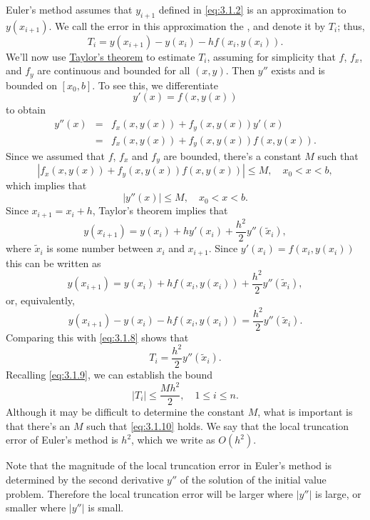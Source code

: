 \documentclass{ximera}
\begin{document}
Euler's method assumes that $y_{i+1}$ defined in \eqref{eq:3.1.2}  is
an approximation to $y(x_{i+1})$. We call the error in this
approximation the ,
and denote it by $T_i$;   thus,
\begin{equation} \label{eq:3.1.8}
T_i=y(x_{i+1})-y(x_i)-hf(x_i,y(x_i)).
\end{equation}
We'll now use
\href{http://www-history.mcs.st-and.ac.uk/Mathematicians/Taylor.html}{Taylor's theorem}
 to estimate $T_i$, assuming for
simplicity that $f$, $f_x$, and $f_y$ are continuous and bounded for
all $(x,y)$. Then $y''$ exists and is bounded on $[x_0,b]$. To see
this, we differentiate
$$
y'(x)=f(x,y(x))
$$
to obtain
\begin{eqnarray*}
y''(x) & = & f_x(x,y(x))+f_y(x,y(x))y'(x)\\
 & = & f_x(x,y(x))+f_y(x,y(x))f(x,y(x)).
\end{eqnarray*}
Since we assumed that $f$, $f_x$ and $f_y$ are bounded, there's
a constant $M$ such that
$$
|f_x(x,y(x))+f_y(x,y(x))f(x,y(x))|\leq M,\quad x_0<x<b,
$$
which implies that
\begin{equation} \label{eq:3.1.9}
|y''(x)|\leq M,\quad x_0<x<b.
\end{equation}
Since $x_{i+1}=x_i+h$, Taylor's theorem implies that
$$
y(x_{i+1})=y(x_i)+hy'(x_i)+\frac{h^2}{2}y''(\tilde x_i),
$$
where $\tilde x_i$ is some number between $x_i$ and $x_{i+1}$.
Since $y'(x_i)=f(x_i,y(x_i))$  this can be written as
$$
y(x_{i+1})=y(x_i)+hf(x_i,y(x_i))+\frac{h^2}{2}y''(\tilde x_i),
$$
or, equivalently,
$$
y(x_{i+1})-y(x_i)-hf(x_i,y(x_i))=\frac{h^2}{2}y''(\tilde x_i).
$$
Comparing this with \eqref{eq:3.1.8} shows that
$$
T_i=\frac{h^2}{2}y''(\tilde x_i).
$$
Recalling \eqref{eq:3.1.9}, we can establish the bound
\begin{equation} \label{eq:3.1.10}
|T_i|\leq \frac{Mh^2}{2},\quad 1\leq i\leq n.
\end{equation}
Although it may be difficult to determine the constant $M$, what is
important is that there's an $M$ such that \eqref{eq:3.1.10} holds.
 We say that the
local truncation error of Euler's method is  $h^2$,
which we write as $O(h^2)$.

Note that the magnitude of the local truncation error in
Euler's method is determined by the second derivative $y''$ of the
solution of the initial value problem. Therefore
 the local truncation error will be larger where $|y''|$ is large,
or smaller where $|y''|$ is small.
\end{document}

